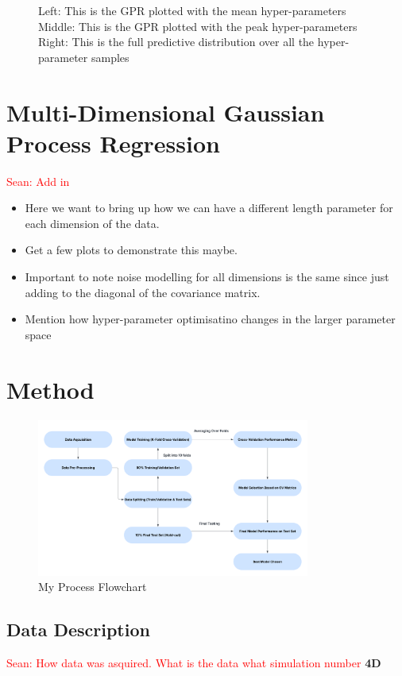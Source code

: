 \documentclass[11pt]{article}
\newcommand{\Sean}[1]{{\textcolor{red}{{Sean: #1}} }}
\begin{document}
\begin{figure}[H]
\begin{subfigure}[b]{0.3\textwidth}
    \end{subfigure}
    \caption{
        Left: This is the GPR plotted with the mean hyper-parameters
        Middle: This is the GPR plotted with the peak hyper-parameters
        Right: This is the full predictive distribution over all the hyper-parameter samples
     }
\end{figure}

\section{Multi-Dimensional Gaussian Process Regression}

\Sean{Add in}
\begin{itemize}
    \item Here we want to bring up how we can have a different length parameter for each dimension of the data.
    \item Get a few plots to demonstrate this maybe.
    \item Important to note noise modelling for all dimensions is the same since just adding to the diagonal of the covariance matrix.
    \item Mention how hyper-parameter optimisatino changes in the larger parameter space
\end{itemize}


\section{Method}

\begin{figure}[H]
    \centering
    \includegraphics[width=0.8\textwidth]{LatexPlots/Flowchart.png}
    \caption{My Process Flowchart}
    \label{fig:flowchart}
\end{figure}

\subsection{Data Description}
\Sean{How data was asquired. What is the data what simulation number}
\noindent
\textbf{4D}
\end{document}
